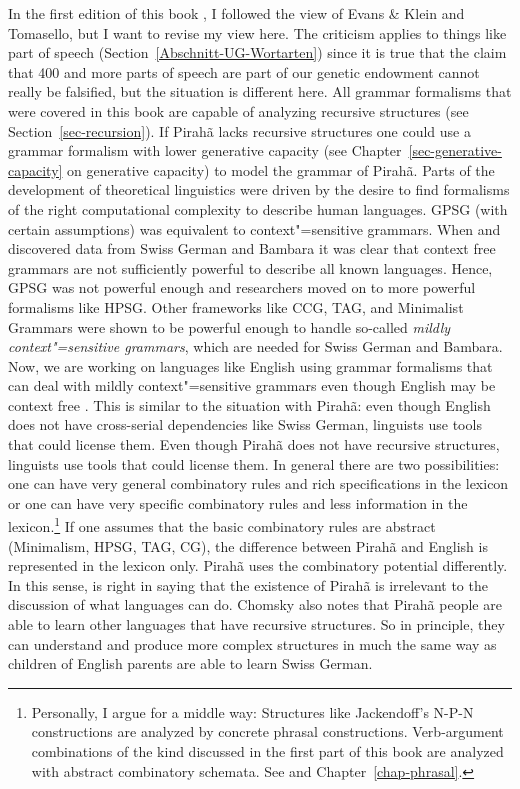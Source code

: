 In the first edition of this book \citep{MuellerGT-Eng1}, I followed the view of Evans \& Klein and
Tomasello, but I want to revise my view here. The criticism applies to things like part of speech
(Section~\ref{Abschnitt-UG-Wortarten}) since it is true that the claim that 400 and more parts of
speech are part of our genetic endowment \citet[, 57]{CR2010a} cannot really be falsified,
but the situation is different here. All grammar formalisms that were covered in this book are
capable of analyzing recursive structures (see Section~\ref{sec-recursion}). If Pirahã lacks recursive
structures one could use a grammar formalism with lower generative capacity (see
Chapter~\ref{sec-generative-capacity} on generative capacity) to model the grammar of Pirahã. Parts
of the development of theoretical linguistics were driven by the desire to find formalisms of the
right computational complexity to describe human languages. GPSG (with certain assumptions) was
equivalent to context"=sensitive grammars. When \citet{Shieber85a} and \citet{Culy85a} discovered
data from Swiss German and Bambara it was clear that context free
grammars are not sufficiently powerful to describe all known languages. Hence, GPSG was not powerful
enough and researchers moved on to more powerful formalisms like HPSG. Other frameworks like CCG,
TAG, and Minimalist Grammars were shown to be powerful enough to handle so-called \emph{mildly
  context"=sensitive grammars}, which are needed for Swiss German and Bambara. Now, we are working on languages
like English using grammar formalisms that can deal with mildly context"=sensitive grammars even though English may be
context free \citep{PR2007a}. This is similar to the situation with Pirahã: even though English
does not have cross-serial dependencies like Swiss German, linguists use tools that could license
them. Even though Pirahã does not have recursive structures, linguists use tools that could license
them. In general there are two possibilities: one can have very general combinatory rules and rich
specifications in the lexicon or one can have very specific combinatory rules and less information
in the lexicon.\footnote{%
  Personally, I argue for a middle way: Structures like Jackendoff's N-P-N constructions \citeyearpar{Jackendoff2008a} are
  analyzed by concrete phrasal constructions. Verb-argument combinations of the kind discussed in
  the first part of this book are analyzed with abstract combinatory schemata. See
   and Chapter~\ref{chap-phrasal}.
}
If one assumes that the basic combinatory rules are abstract (Minimalism, HPSG, TAG, CG), the
difference between Pirahã and English is represented in the lexicon only. Pirahã uses the
combinatory potential differently. In this sense, \citet{Chomsky2014a} is right in saying that the
existence of Pirahã is irrelevant to the discussion of what languages can do. Chomsky also notes
that Pirahã people are able to learn other languages that have recursive structures. So in
principle, they can understand and produce more complex structures in much the same way as children
of English parents are able to learn Swiss German.


